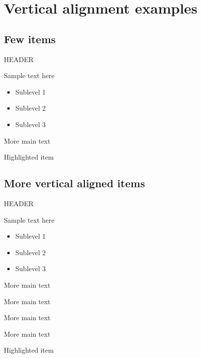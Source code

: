 \documentclass{beamer}
\begin{document}
	\section{Vertical alignment examples}
	
	\subsection{Few items}
	
	\begin{frame}{HEADER}
		\begin{vfilleditems}
			\item Sample text here
			\begin{itemize}
				\item Sublevel 1
				\item Sublevel 2
				\item Sublevel 3
			\end{itemize}
			\item More main text
			\item \alert{Highlighted item}
		\end{vfilleditems}
	\end{frame}
	
	\subsection{More vertical aligned items}
		
	\begin{frame}{HEADER}
		\begin{vfilleditems}
			\item Sample text here
			\begin{itemize}
				\item Sublevel 1
				\item Sublevel 2
				\item Sublevel 3
			\end{itemize}
			\item More main text
			\item More main text
			\item More main text
			\item More main text
			\item \alert{Highlighted item}
		\end{vfilleditems}
	\end{frame}
	
\end{document}
